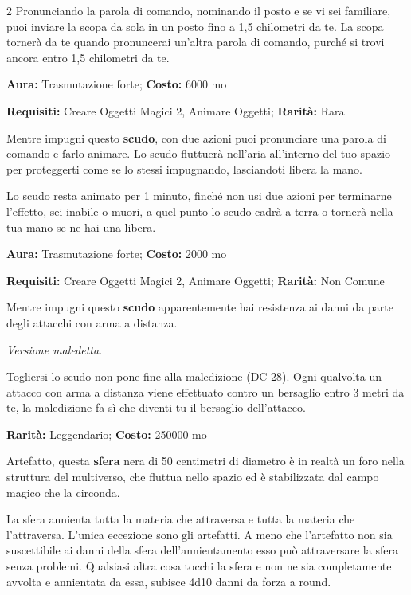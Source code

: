 \begin{multicols}{2}
Pronunciando la parola di comando, nominando il posto e se vi sei familiare, puoi inviare la scopa da sola in un posto fino a 1,5 chilometri da te. La scopa tornerà da te quando pronuncerai un'altra parola di comando, purché si trovi ancora entro 1,5 chilometri da te.


\textbf{Aura:} Trasmutazione forte; \textbf{Costo:} 6000 mo

\textbf{Requisiti:} Creare Oggetti Magici 2, Animare Oggetti; \textbf{Rarità:} Rara

Mentre impugni questo \textbf{scudo}, con due azioni puoi pronunciare una parola di comando e farlo animare. Lo scudo fluttuerà nell'aria all'interno del tuo spazio per proteggerti come se lo stessi impugnando, lasciandoti libera la mano.

Lo scudo resta animato per 1 minuto, finché non usi due azioni per terminarne l'effetto, sei inabile o muori, a quel punto lo scudo cadrà a terra o tornerà nella tua mano se ne hai una libera.


\textbf{Aura:} Trasmutazione forte; \textbf{Costo:} 2000 mo

\textbf{Requisiti:} Creare Oggetti Magici 2, Animare Oggetti; \textbf{Rarità:} Non Comune

Mentre impugni questo \textbf{scudo} apparentemente hai resistenza ai danni da parte degli attacchi con arma a distanza.

\emph{Versione maledetta}.

Togliersi lo scudo non pone fine alla maledizione (DC 28). Ogni qualvolta un attacco con arma a distanza viene effettuato contro un bersaglio entro 3 metri da te, la maledizione fa sì che diventi tu il bersaglio dell'attacco.


\textbf{Rarità:} Leggendario; \textbf{Costo:} 250000 mo

Artefatto, questa \textbf{sfera} nera di 50 centimetri di diametro è in realtà un foro nella struttura del multiverso, che fluttua nello spazio ed è stabilizzata dal campo magico che la circonda.

La sfera annienta tutta la materia che attraversa e tutta la materia che l'attraversa. L'unica eccezione sono gli artefatti. A meno che l'artefatto non sia suscettibile ai danni della sfera dell'annientamento esso può attraversare la sfera senza problemi. Qualsiasi altra cosa tocchi la sfera e non ne sia completamente avvolta e annientata da essa, subisce 4d10 danni da forza a round.


\end{multicols}
